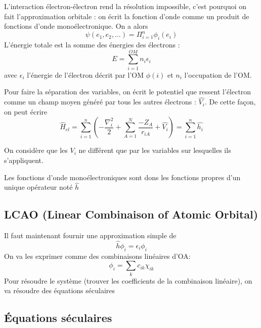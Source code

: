 \documentclass[french]{yLectureNote}
\newcommand{\HH}{\hat{H}}
\newcommand{\lap}{\nabla^2}
\begin{document}
L'interaction électron-électron rend la résolution impossible, c'est pourquoi on fait l'approximation orbitale : on écrit la fonction d'onde comme un produit de fonctions d'onde monoélectronique. On a alors \[\psi(e_1,e_2,\dots) = \Pi_{i=1}^n\phi_i(e_i)\] L'énergie totale est la somme des énergies des électrons : \[E = \sum_{i=1}^{OM}n_i \epsilon_i\] avec \(\epsilon_i\) l'énergie de l'électron décrit par l'OM \(\phi(i)\) et \(n_i\) l'occupation de l'OM.

Pour faire la séparation des variables, on écrit le potentiel que ressent l'électron comme un champ moyen généré par tous les autres électrons : \(\hat{V_i}\). De cette façon, on peut écrire
\[\HH_{el} = \sum_{i=1}^n(-\frac{\lap_i}{2}+\sum_{A=1}^N \frac{-Z_A}{r_{iA}}+\hat{V_i}) = \sum_{i=1}^n \hat{h_i}\]

On considère que les \(V_i\) ne différent que par les variables sur lesquelles ils s'appliquent.

Les fonctions d'onde monoélectroniques sont dons les fonctions propres d'un unique opérateur noté \(\hat{h}\)
\subsection{LCAO (Linear Combinaison of Atomic Orbital)}
Il faut maintenant fournir une approximation simple de \[\hat{h}\phi_i = \epsilon_i\phi_i\]
On va les exprimer comme des combinaisons linéaires d'OA:\[\phi_i = \sum_kc_{ik}\chi_{ik}\]
Pour résoudre le système (trouver les coefficients de la combinaison linéaire), on va résoudre des équations séculaires
\subsection{Équations séculaires}
\end{document}
